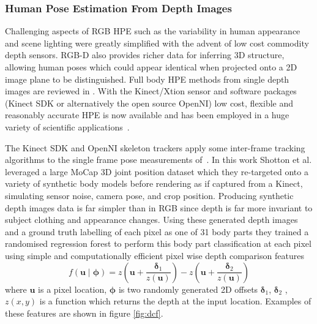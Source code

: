 \documentclass[11pt]{article} %
\begin{document}
\subsubsection{Human Pose Estimation From Depth Images}

Challenging aspects of RGB HPE such as the variability in human appearance and scene lighting were greatly simplified with the advent of low cost commodity depth sensors. RGB-D also provides richer data for inferring 3D structure, allowing human poses which could appear identical when projected onto a 2D image plane to be distinguished. Full body HPE methods from single depth images are reviewed in \cite{Helten2013}. With the Kinect/Xtion sensor and software packages (Kinect SDK or alternatively the open source OpenNI) low cost, flexible and reasonably accurate HPE is now available and has been employed in a huge variety of scientific applications~\cite{Han2013,Giovanni}.

The Kinect SDK and OpenNI skeleton trackers apply some inter-frame tracking algorithms to the single frame pose measurements of~\cite{Shotton2011}. In this work Shotton et al. leveraged a large MoCap 3D joint position dataset which they re-targeted onto a variety of synthetic body models before rendering as if captured from a Kinect, simulating sensor noise, camera pose, and crop position. Producing synthetic depth images data is far simpler than in RGB since depth is far more invariant to subject clothing and appearance changes. Using these generated depth images and a ground truth labelling of each pixel as one of 31 body parts they trained a randomised regression forest to perform this body part classification at each pixel using simple and computationally efficient pixel wise depth comparison features 
\begin{equation}
f(\boldsymbol{u} \mid \boldsymbol{\phi}) = z(\boldsymbol{u}+\frac{\boldsymbol{\delta}_1}{z(\boldsymbol{u})})-z(\boldsymbol{u}+\frac{\boldsymbol{\delta}_2}{z(\boldsymbol{u})})
\label{eq:dcf}
\end{equation}
where $\boldsymbol{u}$ is a pixel location, $\boldsymbol{\phi}$ is two randomly generated 2D offsets $\boldsymbol{\delta}_1$, $\boldsymbol{\delta}_2$ , $z(x,y)$ is a function which returns the depth at the input location. Examples of these features are shown in figure \ref{fig:dcf}.
\end{document}
